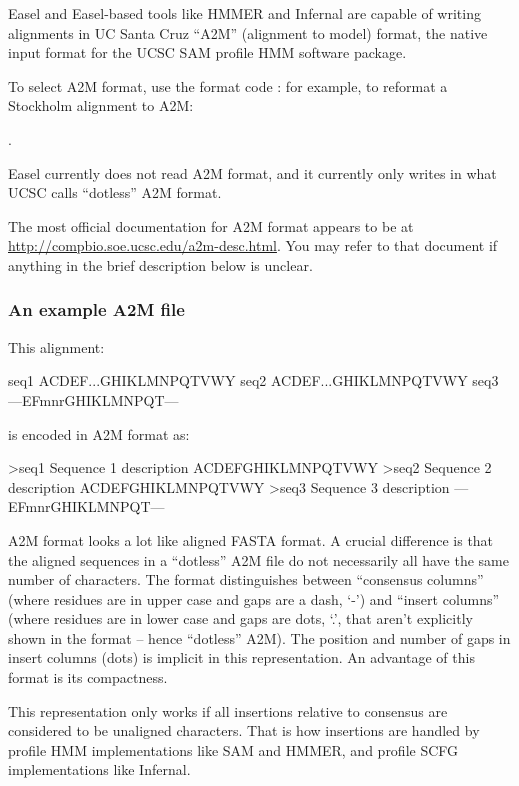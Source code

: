 Easel and Easel-based tools like HMMER and Infernal are capable of
writing alignments in UC Santa Cruz ``A2M'' (alignment to model)
format, the native input format for the UCSC SAM profile HMM software
package.

To select A2M format, use the format code : for example, 
to reformat a Stockholm alignment to A2M:

.

Easel currently does not read A2M format, and it currently only writes
in what UCSC calls ``dotless'' A2M format.

The most official documentation for A2M format appears to be at
\url{http://compbio.soe.ucsc.edu/a2m-desc.html}. You may refer to that
document if anything in the brief description below is unclear.

\subsubsection{An example A2M file}

This alignment:

\begin{cchunk}
seq1  ACDEF...GHIKLMNPQTVWY
seq2  ACDEF...GHIKLMNPQTVWY
seq3  ---EFmnrGHIKLMNPQT---
\end{cchunk}

\noindent 
is encoded in A2M format as:

\begin{cchunk}
>seq1  Sequence 1 description
ACDEFGHIKLMNPQTVWY
>seq2  Sequence 2 description
ACDEFGHIKLMNPQTVWY
>seq3  Sequence 3 description
---EFmnrGHIKLMNPQT---
\end{cchunk}

A2M format looks a lot like aligned FASTA format. A crucial difference
is that the aligned sequences in a ``dotless'' A2M file do not
necessarily all have the same number of characters. The format
distinguishes between ``consensus columns'' (where residues are in
upper case and gaps are a dash, `-') and ``insert columns'' (where
residues are in lower case and gaps are dots, `.', that aren't
explicitly shown in the format -- hence ``dotless'' A2M). The position
and number of gaps in insert columns (dots) is implicit in this
representation.  An advantage of this format is its compactness.

This representation only works if all insertions relative to consensus
are considered to be unaligned characters. That is how insertions are
handled by profile HMM implementations like SAM and HMMER, and profile
SCFG implementations like Infernal.

